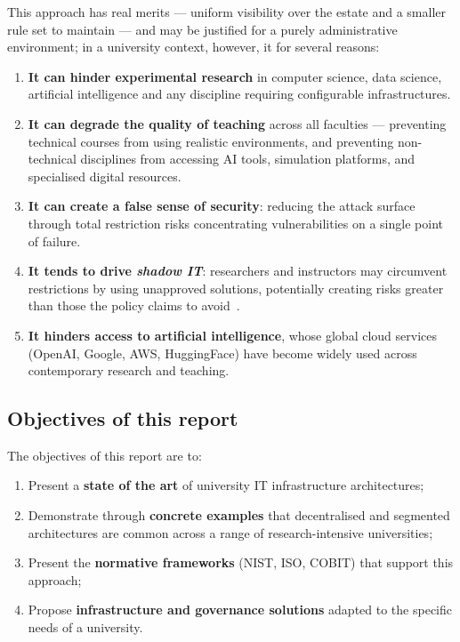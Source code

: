 This approach has real merits --- uniform visibility over the estate
and a smaller rule set to maintain --- and may be justified for a purely
administrative environment; in a university context, however, it
 for several reasons:

\begin{enumerate}[nosep]
    \item \textbf{It can hinder experimental research} in computer science,
    data science, artificial intelligence and any
    discipline requiring configurable infrastructures.
    \item \textbf{It can degrade the quality of teaching} across
    all faculties --- preventing technical courses from using
    realistic environments, and preventing non-technical
    disciplines from accessing AI tools, simulation platforms,
    and specialised digital resources.
    \item \textbf{It can create a false sense of security}: reducing
    the attack surface through total restriction risks concentrating
    vulnerabilities on a single point of failure.
    \item \textbf{It tends to drive \emph{shadow IT}}: researchers and
    instructors may circumvent restrictions by using unapproved
    solutions, potentially creating risks greater than those
    the policy claims to avoid~\cite{shadow-it-umbc}.
    \item \textbf{It hinders access to artificial intelligence},
    whose global cloud services (OpenAI, Google, AWS, HuggingFace)
    have become widely used across contemporary research and teaching.
\end{enumerate}

\subsection{Objectives of this report}

The objectives of this report are to:
\begin{enumerate}[nosep]
    \item Present a \textbf{state of the art} of university
    IT infrastructure architectures;
    \item Demonstrate through \textbf{concrete examples} that decentralised
    and segmented architectures are common across a range of
    research-intensive universities;
    \item Present the \textbf{normative frameworks} (NIST, ISO, COBIT)
    that support this approach;
    \item Propose \textbf{infrastructure and governance solutions}
    adapted to the specific needs of a university.
\end{enumerate}

